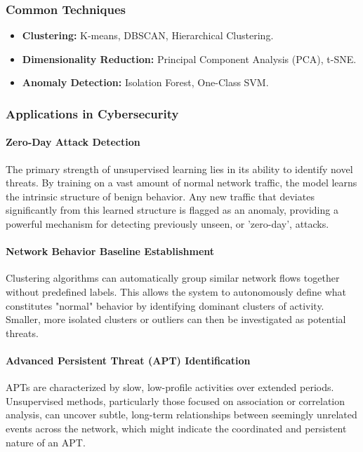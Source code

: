 \documentclass[16pt]{report}
\begin{document}
\subsubsection{Common Techniques}
\begin{itemize}
    \item \textbf{Clustering:} K-means, DBSCAN, Hierarchical Clustering.
    \item \textbf{Dimensionality Reduction:} Principal Component Analysis (PCA), t-SNE.
    \item \textbf{Anomaly Detection:} Isolation Forest, One-Class SVM.
\end{itemize}

\subsubsection{Applications in Cybersecurity}
\paragraph{Zero-Day Attack Detection}
The primary strength of unsupervised learning lies in its ability to identify novel threats. By training on a vast amount of normal network traffic, the model learns the intrinsic structure of benign behavior. Any new traffic that deviates significantly from this learned structure is flagged as an anomaly, providing a powerful mechanism for detecting previously unseen, or 'zero-day', attacks.

\paragraph{Network Behavior Baseline Establishment}
Clustering algorithms can automatically group similar network flows together without predefined labels. This allows the system to autonomously define what constitutes "normal" behavior by identifying dominant clusters of activity. Smaller, more isolated clusters or outliers can then be investigated as potential threats.

\paragraph{Advanced Persistent Threat (APT) Identification}
APTs are characterized by slow, low-profile activities over extended periods. Unsupervised methods, particularly those focused on association or correlation analysis, can uncover subtle, long-term relationships between seemingly unrelated events across the network, which might indicate the coordinated and persistent nature of an APT.
\end{document}
